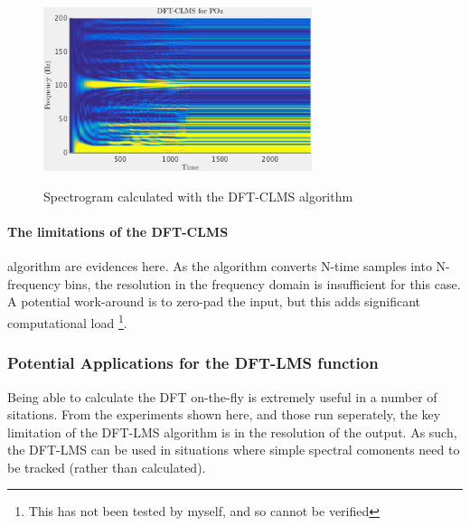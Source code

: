 \documentclass[main.tex]{subfiles}
\begin{document}
\begin{figure}[H]
	\centering
	\includegraphics[width=0.7\textwidth]{images/4-3-b-poz.png}
	\label{fig:4-3-b-poz}
	\caption{Spectrogram calculated with the DFT-CLMS algorithm}
\end{figure}%

\paragraph{The limitations of the DFT-CLMS} algorithm are evidences here. As the algorithm converts N-time samples into N-frequency bins, the resolution in the frequency domain is insufficient for this case. A potential work-around is to zero-pad the input, but this adds significant computational load \footnote{This has not been tested by myself, and so cannot be verified}.

\subsubsection{Potential Applications for the DFT-LMS function}

Being able to calculate the DFT on-the-fly is extremely useful in a number of sitations. From the experiments shown here, and those run seperately, the key limitation of the DFT-LMS algorithm is in the resolution of the output. As such, the DFT-LMS can be used in situations where simple spectral comonents need to be tracked (rather than calculated). 
\end{document}
